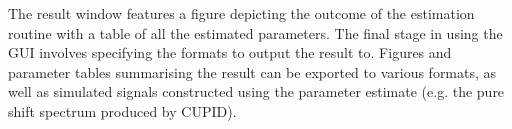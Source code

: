 The result window features a figure depicting the outcome of the
estimation routine with a table of all the estimated parameters.
The final stage in using the \ac{GUI} involves specifying the formats to output
the result to. Figures and parameter tables summarising the result can be
exported to various formats, as well as simulated signals constructed using the
parameter estimate (e.g. the pure shift spectrum produced by \ac{CUPID}).
